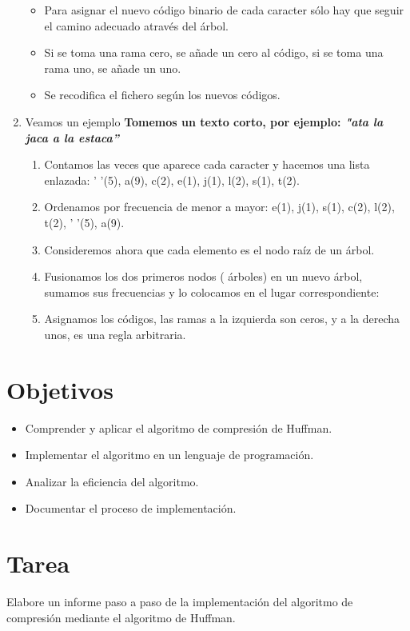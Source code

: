 \documentclass{article}
\begin{document}
\begin{enumerate}
\begin{itemize}
      \item Para asignar el nuevo código binario de cada caracter sólo hay que seguir el camino adecuado através del árbol. 
      \item Si se toma una rama cero, se añade un cero al código, si se toma una rama uno, se añade un uno.
      \item Se recodifica el fichero según los nuevos códigos.
    \end{itemize}
    \item Veamos un ejemplo \textbf{Tomemos un texto corto, por ejemplo: \textit{"ata la jaca a la estaca”}}
    \begin{enumerate}
      \item Contamos las veces que aparece cada caracter y hacemos una lista enlazada: ’  ’(5), a(9), c(2), e(1), j(1), 
      l(2), s(1), t(2).
      \item Ordenamos por frecuencia de menor a mayor: e(1), j(1), s(1), c(2), l(2), t(2), ’  ’(5), a(9).
      \item Consideremos ahora que cada elemento es el nodo raíz de un árbol.
      \item Fusionamos los dos primeros nodos ( árboles) en un nuevo  árbol, sumamos sus frecuencias y lo colocamos 
      en el lugar correspondiente:
      \item Asignamos los códigos, las ramas a la izquierda son ceros, y a la derecha unos, es una regla arbitraria.
    \end{enumerate}
  \end{enumerate}


  \section{Objetivos}
  \begin{itemize}
    \item Comprender y aplicar el algoritmo de compresión de Huffman.
    \item Implementar el algoritmo en un lenguaje de programación.
    \item Analizar la eficiencia del algoritmo.
    \item Documentar el proceso de implementación.
  \end{itemize}

 
	\section{Tarea}
  Elabore un informe paso a paso de la implementación del algoritmo de compresión mediante el algoritmo de Huffman.
 
\end{document}
